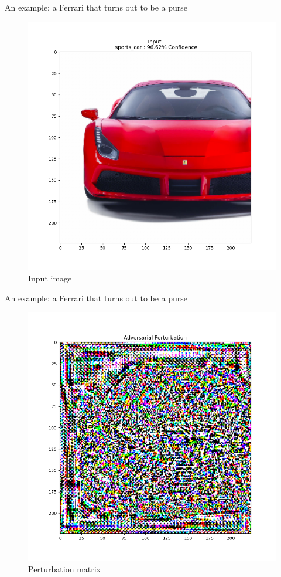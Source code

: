 \documentclass[8pt]{beamer}
\begin{document}
\begin{frame}{An example: a Ferrari that turns out to be a purse}
\begin{figure} 
    \includegraphics[scale=0.3]{images/input.png}
    \vspace*{-5mm}
    \caption{Input image}
\end{figure}
\end{frame}

\begin{frame}{An example: a Ferrari that turns out to be a purse}
\begin{figure} 
    \includegraphics[scale=0.3]{images/perturbation.png}
    \vspace*{-5mm}
    \caption{Perturbation matrix}
\end{figure}
\end{frame}
\end{document}

